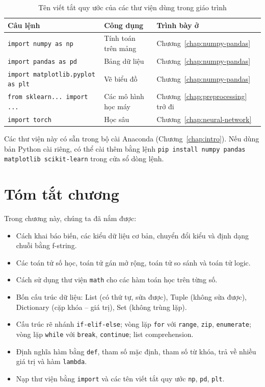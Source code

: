 \begin{table}[H]
\centering
\begin{tabular}{|p{6.4cm}|p{3.6cm}|p{3.8cm}|}
\hline
\textbf{Câu lệnh} & \textbf{Công dụng} & \textbf{Trình bày ở} \\
\hline
\texttt{import numpy as np} & Tính toán trên mảng & Chương~\ref{chap:numpy-pandas} \\
\hline
\texttt{import pandas as pd} & Bảng dữ liệu & Chương~\ref{chap:numpy-pandas} \\
\hline
\texttt{import matplotlib.pyplot as plt} & Vẽ biểu đồ & Chương~\ref{chap:numpy-pandas} \\
\hline
\texttt{from sklearn... import ...} & Các mô hình học máy & Chương~\ref{chap:preprocessing} trở đi \\
\hline
\texttt{import torch} & Học sâu & Chương~\ref{chap:neural-network} \\
\hline
\end{tabular}
\caption{Tên viết tắt quy ước của các thư viện dùng trong giáo trình}
\end{table}

Các thư viện này có sẵn trong bộ cài Anaconda (Chương~\ref{chap:intro}). Nếu dùng bản Python cài riêng, có thể cài thêm bằng lệnh \texttt{pip install numpy pandas matplotlib scikit-learn} trong cửa sổ dòng lệnh.

\section{Tóm tắt chương}
Trong chương này, chúng ta đã nắm được:
\begin{itemize}
    \item Cách khai báo biến, các kiểu dữ liệu cơ bản, chuyển đổi kiểu và định dạng chuỗi bằng f-string.
    \item Các toán tử số học, toán tử gán mở rộng, toán tử so sánh và toán tử logic.
    \item Cách sử dụng thư viện \texttt{math} cho các hàm toán học trên từng số.
    \item Bốn cấu trúc dữ liệu: List (có thứ tự, sửa được), Tuple (không sửa được), Dictionary (cặp khóa -- giá trị), Set (không trùng lặp).
    \item Cấu trúc rẽ nhánh \texttt{if-elif-else}; vòng lặp \texttt{for} với \texttt{range}, \texttt{zip}, \texttt{enumerate}; vòng lặp \texttt{while} với \texttt{break}, \texttt{continue}; list comprehension.
    \item Định nghĩa hàm bằng \texttt{def}, tham số mặc định, tham số từ khóa, trả về nhiều giá trị và hàm \texttt{lambda}.
    \item Nạp thư viện bằng \texttt{import} và các tên viết tắt quy ước \texttt{np}, \texttt{pd}, \texttt{plt}.
\end{itemize}

